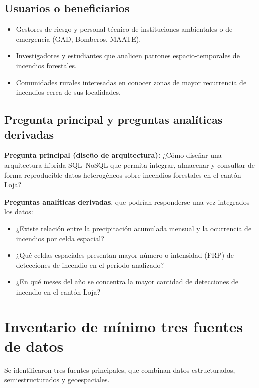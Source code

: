 \documentclass[11pt,a4paper]{article}
\begin{document}
\subsection{Usuarios o beneficiarios}

\begin{itemize}
    \item Gestores de riesgo y personal t\'ecnico de instituciones ambientales o de emergencia (GAD, Bomberos, MAATE).
    \item Investigadores y estudiantes que analicen patrones espacio-temporales de incendios forestales.
    \item Comunidades rurales interesadas en conocer zonas de mayor recurrencia de incendios cerca de sus localidades.
\end{itemize}

\subsection{Pregunta principal y preguntas anal\'iticas derivadas}

\textbf{Pregunta principal (dise\~no de arquitectura):} ¿C\'omo dise\~nar una arquitectura h\'ibrida SQL--NoSQL que permita integrar, almacenar y consultar de forma reproducible datos heterog\'eneos sobre incendios forestales en el cant\'on Loja?

\textbf{Preguntas anal\'iticas derivadas}, que podr\'ian responderse una vez integrados los datos:
\begin{itemize}
    \item ¿Existe relaci\'on entre la precipitaci\'on acumulada mensual y la ocurrencia de incendios por celda espacial?
    \item ¿Qu\'e celdas espaciales presentan mayor n\'umero o intensidad (FRP) de detecciones de incendio en el periodo analizado?
    \item ¿En qu\'e meses del a\~no se concentra la mayor cantidad de detecciones de incendio en el cant\'on Loja?
\end{itemize}

\section{Inventario de m\'inimo tres fuentes de datos}

Se identificaron tres fuentes principales, que combinan datos estructurados, semiestructurados y geoespaciales.
\end{document}
